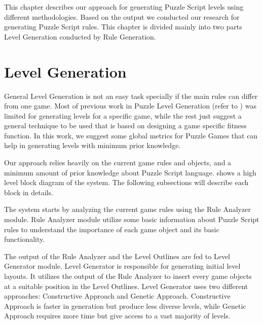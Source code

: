 This chapter describes our approach for generating Puzzle Script levels using different methodologies. Based on the output we conducted our research for generating Puzzle Script rules. This chapter is divided mainly into two parts Level Generation conducted by Rule Generation.

\section{Level Generation}
General Level Generation is not an easy task specially if the main rules can differ from one game. Most of previous work in Puzzle Level Generation (refer to ) was limited for generating levels for a specific game, while the rest just suggest a general technique to be used that is based on designing a game specific fitness function. In this work, we suggest some global metrics for Puzzle Games that can help in generating levels with minimum prior knowledge.\\\par

Our approach relies heavily on the current game rules and objects, and a minimum amount of prior knowledge about Puzzle Script language.  shows a high level block diagram of the system. The following subsections will describe each block in details.


The system starts by analyzing the current game rules using the Rule Analyzer module. Rule Analyzer module utilize some basic information about Puzzle Script rules to understand the importance of each game object and its basic functionality.\\\par

The output of the Rule Analyzer and the Level Outlines are fed to Level Generator module. Level Generator is responsible for generating initial level layouts. It utilizes the output of the Rule Analyzer to insert every game objects at a suitable position in the Level Outlines. Level Generator uses two different approaches: Constructive Approach and Genetic Approach. Constructive Approach is faster in generation but produce less diverse levels, while Genetic Approach requires more time but give access to a vast majority of levels.\\\par

